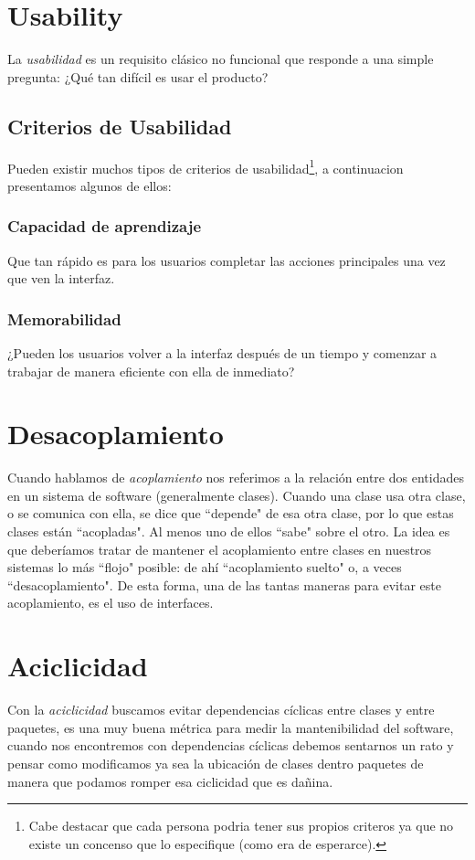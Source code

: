 \documentclass[a4paper,11pt]{article}
\begin{document}
\section{Usability}
La \emph{usabilidad} es un requisito clásico no funcional\cite{USABILITY} que 
responde a una simple pregunta: ¿Qué tan difícil es usar el producto?

\subsection{Criterios de Usabilidad}
Pueden existir muchos tipos de criterios de usabilidad\footnote{Cabe destacar 
que cada persona podria tener sus propios criteros ya que no existe un concenso 
que lo especifique (como era de esperarce).}, a continuacion presentamos 
algunos de ellos:

\subsubsection{Capacidad de aprendizaje}
Que tan rápido es para los usuarios completar las acciones principales una vez 
que ven la interfaz.

\subsubsection{Memorabilidad}
¿Pueden los usuarios volver a la interfaz después de un tiempo y comenzar a 
trabajar de manera eficiente con ella de inmediato?

\section{Desacoplamiento}
Cuando hablamos de \emph{acoplamiento} nos referimos a la relación entre dos 
entidades en un sistema de software (generalmente clases).  Cuando una clase 
usa otra clase, o se comunica con ella, se dice que ``depende" de esa otra 
clase, por lo que estas clases están ``acopladas". Al menos uno de ellos 
``sabe" sobre el otro. La idea es que deberíamos tratar de mantener el 
acoplamiento entre clases en nuestros sistemas lo más ``flojo" posible: de ahí 
``acoplamiento suelto" o, a veces ``desacoplamiento". De esta forma, una de las 
tantas maneras para evitar este acoplamiento, es el uso de interfaces.

\section{Aciclicidad}
Con la \emph{aciclicidad} buscamos evitar dependencias cíclicas entre clases y 
entre paquetes, es una muy buena métrica para medir la mantenibilidad del 
software, cuando nos encontremos con dependencias cíclicas debemos sentarnos un 
rato y pensar como modificamos ya sea la ubicación de clases dentro paquetes de 
manera que podamos romper esa ciclicidad que es dañina.  
\end{document}
